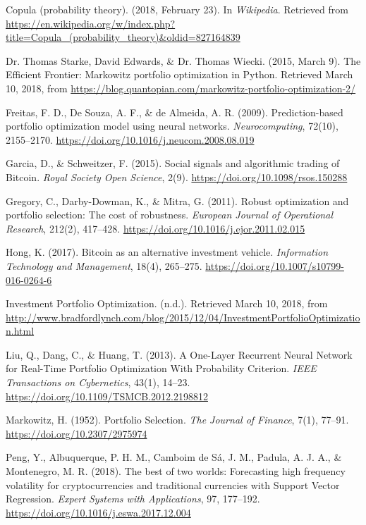 \documentclass[12pt]{article} %
\begin{document}
 \begin{hangparas}{.25in}{1}


Copula (probability theory). (2018, February 23). In \emph{Wikipedia}. Retrieved from
\url{ https://en.wikipedia.org/w/index.php?title=Copula_(probability_theory)&oldid=827164839}

Dr. Thomas Starke, David Edwards, \& Dr. Thomas Wiecki. (2015, March 9). The Efficient Frontier: Markowitz portfolio optimization in Python. Retrieved March 10, 2018, from \url{https://blog.quantopian.com/markowitz-portfolio-optimization-2/}

Freitas, F. D., De Souza, A. F., \& de Almeida, A. R. (2009). Prediction-based portfolio optimization model using neural networks. \emph{Neurocomputing}, 72(10), 2155–2170. \url{https://doi.org/10.1016/j.neucom.2008.08.019}

Garcia, D., \& Schweitzer, F. (2015). Social signals and algorithmic trading of Bitcoin. \emph{Royal Society Open Science}, 2(9). \url{https://doi.org/10.1098/rsos.150288}

Gregory, C., Darby-Dowman, K., \& Mitra, G. (2011). Robust optimization and portfolio selection: The cost of robustness. \emph{European Journal of Operational Research}, 212(2), 417–428. \url{https://doi.org/10.1016/j.ejor.2011.02.015}

Hong, K. (2017). Bitcoin as an alternative investment vehicle. \emph{Information Technology and Management}, 18(4), 265–275. \url{https://doi.org/10.1007/s10799-016-0264-6}

Investment Portfolio Optimization. (n.d.). Retrieved March 10, 2018, from \url{http://www.bradfordlynch.com/blog/2015/12/04/InvestmentPortfolioOptimization.html}

Liu, Q., Dang, C., \& Huang, T. (2013). A One-Layer Recurrent Neural Network for Real-Time Portfolio Optimization With Probability Criterion. \emph{IEEE Transactions on Cybernetics}, 43(1), 14–23. \url{https://doi.org/10.1109/TSMCB.2012.2198812}

Markowitz, H. (1952). Portfolio Selection. \emph{The Journal of Finance}, 7(1), 77–91. \url{https://doi.org/10.2307/2975974}

Peng, Y., Albuquerque, P. H. M., Camboim de Sá, J. M., Padula, A. J. A., \& Montenegro, M. R. (2018). The best of two worlds: Forecasting high frequency volatility for cryptocurrencies and traditional currencies with Support Vector Regression. \emph{Expert Systems with Applications}, 97, 177–192. \url{https://doi.org/10.1016/j.eswa.2017.12.004}


\end{hangparas}
\end{document}
